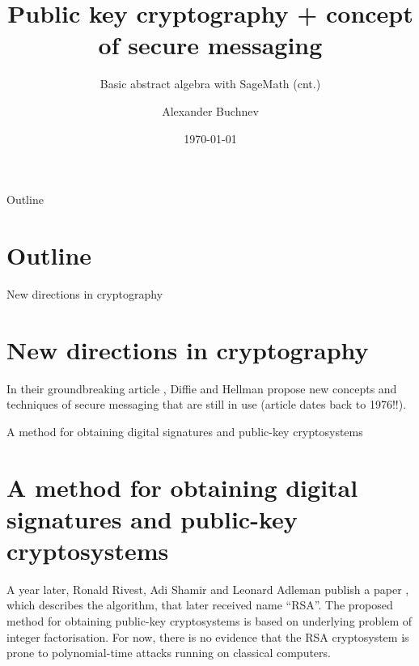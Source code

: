 \documentclass{beamer}
\title{Public key cryptography + concept of secure messaging}
\subtitle{Basic abstract algebra with SageMath (cnt.)}
\author{Alexander Buchnev}
\date{\monthYear\today}
\begin{document}
\frame{
	\titlepage
}

\newtheorem{prop}{Proposition}


\begin{frame}{Outline}
    \section{Outline}
	\tableofcontents
\end{frame}

\begin{frame}{New directions in cryptography}
    \section{New directions in cryptography}
    In their groundbreaking article \cite{diffie-hellman:1976}, Diffie and Hellman propose new concepts and techniques
    of secure messaging that are still in use (article dates back to 1976!!).
\end{frame}

\begin{frame}{A method for obtaining digital signatures and public-key cryptosystems}
    \section{A method for obtaining digital signatures and public-key cryptosystems}
    A year later, Ronald Rivest, Adi Shamir and Leonard Adleman publish a paper \cite{rsa-1978}, which describes the algorithm, that
	later received name ``RSA''. The proposed method for obtaining public-key cryptosystems is based on underlying problem of integer
    factorisation. For now, there is no evidence that the RSA cryptosystem is prone to polynomial-time attacks running on classical
    computers.
\end{frame}
\end{document}
